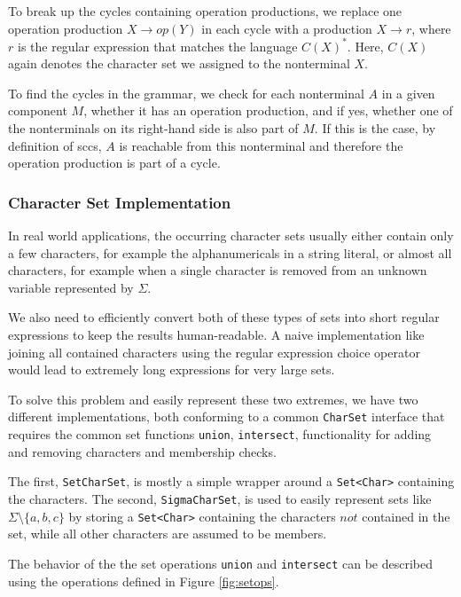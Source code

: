 To break up the cycles containing operation productions, we replace one operation production $X \rightarrow op(Y)$ in each cycle with a production $X \rightarrow r$, where $r$ is the regular expression that matches the language $C(X)^*$. Here, $C(X)$ again denotes the character set we assigned to the nonterminal $X$.

To find the cycles in the grammar, we check for each nonterminal $A$ in a given component $M$, whether it has an operation production, and if yes, whether one of the nonterminals on its right-hand side is also part of $M$. If this is the case, by definition of \acp{scc}, $A$ is reachable from this nonterminal and therefore the operation production is part of a cycle.

\subsubsection{Character Set Implementation}

In real world applications, the occurring character sets usually either contain only a few characters, for example the alphanumericals in a string literal, or almost all characters, for example when a single character is removed from an unknown variable represented by $\Sigma$.

We also need to efficiently convert both of these types of sets into short regular expressions to keep the results human-readable. A naive implementation like joining all contained characters using the regular expression choice operator would lead to extremely long expressions for very large sets.

To solve this problem and easily represent these two extremes, we have two different implementations, both conforming to a common \lstinline|CharSet| interface that requires the common set functions \lstinline|union|, \lstinline|intersect|, functionality for adding and removing characters and membership checks.

The first, \lstinline|SetCharSet|, is mostly a simple wrapper around a \lstinline|Set<Char>| containing the characters.
The second, \lstinline|SigmaCharSet|, is used to easily represent sets like $\Sigma \setminus \{a, b, c\}$ by storing a \lstinline|Set<Char>| containing the characters $not$ contained in the set, while all other characters are assumed to be members.

The behavior of the the set operations \lstinline|union| and \lstinline|intersect| can be described using the operations defined in Figure \ref{fig:setops}.

